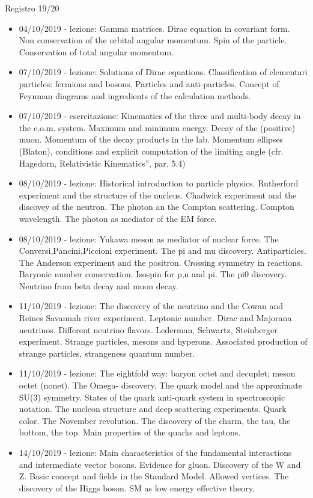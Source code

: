 \begin{frame}[allowframebreaks]{Registro 19/20}
\begin{itemize}
\item 04/10/2019 - lezione: Gamma matrices. Dirac equation in covariant form. Non conservation of the orbital angular momentum. Spin of the particle. Conservation of total angular momentum.
\item 07/10/2019 - lezione: Solutions of Dirac equations. Classification of elementari particles: fermions and bosons. Particles and anti-particles. Concept of Feynman diagrams and ingredients of the calculation methods.
\item 07/10/2019 - esercitazione: Kinematics of the three and multi-body decay in the c.o.m. system. Maximum and minimum energy. Decay of the (positive) muon. Momentum of the decay products in the lab. Momentum ellipses (Blaton), conditions and explicit computation of the limiting angle (cfr. Hagedorn, Relativistic Kinematics”, par. 5.4)
\item 08/10/2019 - lezione: Historical introduction to particle physics. Rutherford experiment and the structure of the nucleus. Chadwick experiment and the discovey of the neutron. The photon an the Compton scattering. Compton wavelength. The photon as mediator of the EM force.
\item 08/10/2019 - lezione: Yukawa meson as mediator of nuclear force. The Conversi,Pancini,Piccioni experiment. The pi and mu discovery. Antiparticles. The Anderson experiment and the positron. Crossing symmetry in reactions. Baryonic number conservation. Isospin for p,n and pi. The pi0 discovery. Neutrino from beta decay and muon decay.
\item 11/10/2019 - lezione: The discovery of the neutrino and the Cowan and Reines Savannah river experiment. Leptonic number. Dirac and Majorana neutrinos. Different neutrino flavors. Lederman, Schwartz, Steinberger experiment. Strange particles, mesons and hyperons. Associated production of strange particles, strangeness quantum number.
\item 11/10/2019 - lezione: The eightfold way: baryon octet and decuplet; meson octet (nonet). The Omega- discovery. The quark model and the approximate SU(3) symmetry. States of the quark anti-quark system in spectroscopic notation. The nucleon structure and deep scattering experiments. Quark color. The November revolution. The discovery of the charm, the tau, the bottom, the top. Main properties of the quarks and leptons.
\item 14/10/2019 - lezione: Main characteristics of the fundamental interactions and intermediate vector bosons. Evidence for gluon. Discovery of the W and Z. Basic concept and fields in the Standard Model. Allowed vertices. The discovery of the Higgs boson. SM as low energy effective theory.

\end{itemize}
\end{frame}
